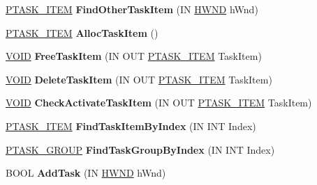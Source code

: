 \begin{DoxyCompactItemize}
\hyperlink{struct___t_a_s_k___i_t_e_m}{P\+T\+A\+S\+K\+\_\+\+I\+T\+EM} {\bfseries Find\+Other\+Task\+Item} (IN \hyperlink{interfacevoid}{H\+W\+ND} h\+Wnd)
\item 
\mbox{\label{class_c_task_switch_wnd_a5c516811bacad723b18df32a4ffe5c22}} 
\hyperlink{struct___t_a_s_k___i_t_e_m}{P\+T\+A\+S\+K\+\_\+\+I\+T\+EM} {\bfseries Alloc\+Task\+Item} ()
\item 
\mbox{\label{class_c_task_switch_wnd_a4e26c6fa0b1096cbeb85f099ed3a4dae}} 
\hyperlink{interfacevoid}{V\+O\+ID} {\bfseries Free\+Task\+Item} (IN O\+UT \hyperlink{struct___t_a_s_k___i_t_e_m}{P\+T\+A\+S\+K\+\_\+\+I\+T\+EM} Task\+Item)
\item 
\mbox{\label{class_c_task_switch_wnd_a80025f3120b4c2b780d2425174e52d8f}} 
\hyperlink{interfacevoid}{V\+O\+ID} {\bfseries Delete\+Task\+Item} (IN O\+UT \hyperlink{struct___t_a_s_k___i_t_e_m}{P\+T\+A\+S\+K\+\_\+\+I\+T\+EM} Task\+Item)
\item 
\mbox{\label{class_c_task_switch_wnd_a3a456f38e83d2356ceb92da2fa27aad6}} 
\hyperlink{interfacevoid}{V\+O\+ID} {\bfseries Check\+Activate\+Task\+Item} (IN O\+UT \hyperlink{struct___t_a_s_k___i_t_e_m}{P\+T\+A\+S\+K\+\_\+\+I\+T\+EM} Task\+Item)
\item 
\mbox{\label{class_c_task_switch_wnd_adb110eabfb13742d74fa9abcace849f2}} 
\hyperlink{struct___t_a_s_k___i_t_e_m}{P\+T\+A\+S\+K\+\_\+\+I\+T\+EM} {\bfseries Find\+Task\+Item\+By\+Index} (IN I\+NT Index)
\item 
\mbox{\label{class_c_task_switch_wnd_a928246fb11ac124771fbb96947450801}} 
\hyperlink{struct___t_a_s_k___g_r_o_u_p}{P\+T\+A\+S\+K\+\_\+\+G\+R\+O\+UP} {\bfseries Find\+Task\+Group\+By\+Index} (IN I\+NT Index)
\item 
\mbox{\label{class_c_task_switch_wnd_afe6efc87835c93420b696aabe94a7897}} 
B\+O\+OL {\bfseries Add\+Task} (IN \hyperlink{interfacevoid}{H\+W\+ND} h\+Wnd)
\item 
\mbox{\label{class_c_task_switch_wnd_a83d47004d409ede08152bc8c33a87183}} 

\end{DoxyCompactItemize}
